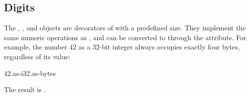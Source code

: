 
\subsection{Digits}\label{sec:digits}

The , , and  objects are decorators
  of  with a predefined size.
They implement the same numeric operations as ,
  and can be converted to  through the  attribute.
For example, the number \(42\) as a 32-bit integer always occupies
  exactly four bytes, regardless of its value:

\begin{ffcode}
42.as-i32.as-bytes
\end{ffcode}

The result is .
